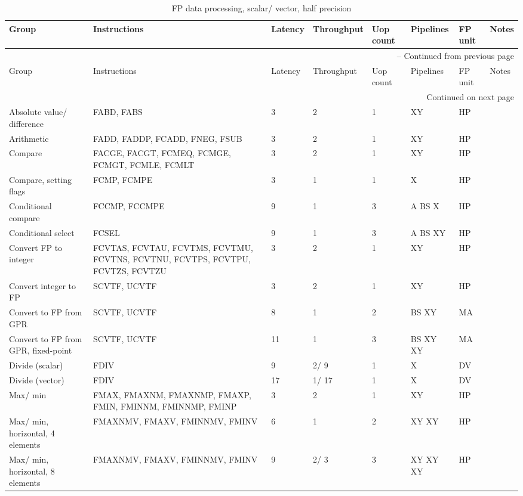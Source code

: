 \begin{longtable}{|p{1in}|p{1in}|l|l|l|p{1in}|l|p{1in}|}
\caption{FP data processing, scalar/ vector, half precision} \\
\hline
Group & Instructions & Latency & Throughput & Uop count & Pipelines & FP unit & Notes\\
\hline
\endfirsthead
\hline
\multicolumn{8}{|r|}{{\tablename\ \thetable{} -- Continued from previous page}} \\
\hline
Group & Instructions & Latency & Throughput & Uop count & Pipelines & FP unit & Notes\\
\hline
\endhead
\hline
\multicolumn{8}{|r|}{{Continued on next page}} \\
\hline
\endfoot
\hline
\endlastfoot
Absolute value/ difference & FABD, FABS & 3 & 2 & 1 & XY & HP & \\
\hline
Arithmetic & FADD, FADDP, FCADD, FNEG, FSUB & 3 & 2 & 1 & XY & HP & \\
\hline
Compare & FACGE, FACGT, FCMEQ, FCMGE, FCMGT, FCMLE, FCMLT & 3 & 2 & 1 & XY & HP & \\
\hline
Compare, setting flags & FCMP, FCMPE & 3 & 1 & 1 & X & HP & \\
\hline
Conditional compare & FCCMP, FCCMPE & 9 & 1 & 3 & A BS X & HP & \\
\hline
Conditional select & FCSEL & 9 & 1 & 3 & A BS XY & HP & \\
\hline
Convert FP to integer & FCVTAS, FCVTAU, FCVTMS, FCVTMU, FCVTNS, FCVTNU, FCVTPS, FCVTPU, FCVTZS, FCVTZU & 3 & 2 & 1 & XY & HP & \\
\hline
Convert integer to FP & SCVTF, UCVTF & 3 & 2 & 1 & XY & HP & \\
\hline
Convert to FP from GPR & SCVTF, UCVTF & 8 & 1 & 2 & BS XY & MA & \\
\hline
Convert to FP from GPR, fixed-point & SCVTF, UCVTF & 11 & 1 & 3 & BS XY XY & MA & \\
\hline
Divide (scalar) & FDIV & 9 & 2/ 9 & 1 & X & DV & \\
\hline
Divide (vector) & FDIV & 17 & 1/ 17 & 1 & X & DV & \\
\hline
Max/ min & FMAX, FMAXNM, FMAXNMP, FMAXP, FMIN, FMINNM, FMINNMP, FMINP & 3 & 2 & 1 & XY & HP & \\
\hline
Max/ min, horizontal, 4 elements & FMAXNMV, FMAXV, FMINNMV, FMINV & 6 & 1 & 2 & XY XY & HP & \\
\hline
Max/ min, horizontal, 8 elements & FMAXNMV, FMAXV, FMINNMV, FMINV & 9 & 2/ 3 & 3 & XY XY XY & HP & \\

\end{longtable}
